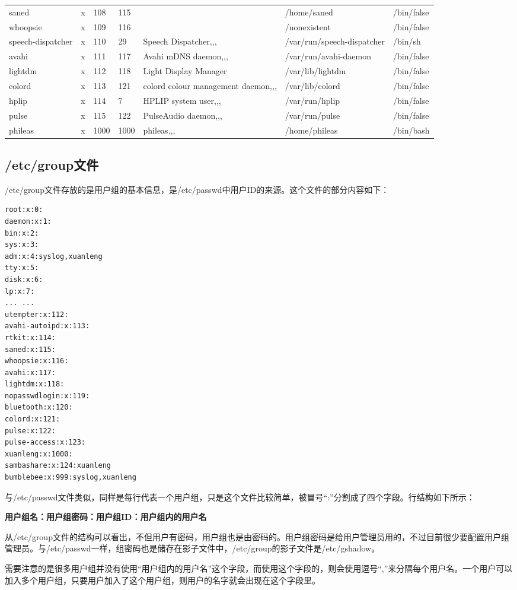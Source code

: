 {\begin{tabular}{l|l|l|l|l|l|l}
saned&x&108&115&&/home/saned&/bin/false\\
whoopsie&x&109&116&&/nonexistent&/bin/false\\
speech-dispatcher&x&110&29&Speech Dispatcher,,,&/var/run/speech-dispatcher&/bin/sh\\
avahi&x&111&117&Avahi mDNS daemon,,,&/var/run/avahi-daemon&/bin/false\\
lightdm&x&112&118&Light Display Manager&/var/lib/lightdm&/bin/false\\
colord&x&113&121&colord colour management daemon,,,&/var/lib/colord&/bin/false\\
hplip&x&114&7&HPLIP system user,,,&/var/run/hplip&/bin/false\\
pulse&x&115&122&PulseAudio daemon,,,&/var/run/pulse&/bin/false\\
phileas&x&1000&1000&phileas,,,&/home/phileas&/bin/bash\\
\end{tabular}
}


\subsection{/etc/group文件}
/etc/group文件存放的是用户组的基本信息，是/etc/passwd中用户ID的来源。这个文件的部分内容如下：
\begin{verbatim}
root:x:0:
daemon:x:1:
bin:x:2:
sys:x:3:
adm:x:4:syslog,xuanleng
tty:x:5:
disk:x:6:
lp:x:7:
... ...
utempter:x:112:
avahi-autoipd:x:113:
rtkit:x:114:
saned:x:115:
whoopsie:x:116:
avahi:x:117:
lightdm:x:118:
nopasswdlogin:x:119:
bluetooth:x:120:
colord:x:121:
pulse:x:122:
pulse-access:x:123:
xuanleng:x:1000:
sambashare:x:124:xuanleng
bumblebee:x:999:syslog,xuanleng
\end{verbatim}

与/etc/passwd文件类似，同样是每行代表一个用户组，只是这个文件比较简单，被冒号“:”分割成了四个字段。行结构如下所示：

\centerline{\textbf{用户组名：用户组密码：用户组ID：用户组内的用户名}}

从/etc/group文件的结构可以看出，不但用户有密码，用户组也是由密码的。用户组密码是给用户管理员用的，不过目前很少要配置用户组管理员。与/etc/passwd一样，组密码也是储存在影子文件中，/etc/group的影子文件是/etc/gshadow。

需要注意的是很多用户组并没有使用“用户组内的用户名”这个字段，而使用这个字段的，则会使用逗号“,”来分隔每个用户名。一个用户可以加入多个用户组，只要用户加入了这个用户组，则用户的名字就会出现在这个字段里。


